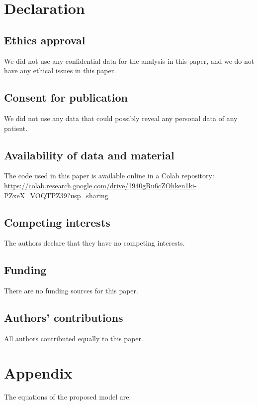 \documentclass[11pt]{article}
\begin{document}
\section{Declaration}

\subsection{Ethics approval} We did not use any confidential data for the analysis in this paper, and we do not have any ethical issues in this paper.

\subsection{Consent for publication}

We did not use any data that could possibly reveal any personal data of any patient.

\subsection{Availability of data and material} The code used in this paper is available online in a Colab repository: \url{https://colab.research.google.com/drive/1940gRu6cZOhken1ki-PZxeX_VOQTPZ39?usp=sharing}

\subsection{ Competing interests } The authors declare that they have no competing interests.


\subsection{ Funding } There are no funding sources for this paper.

\subsection{Authors' contributions}  All authors contributed equally to this paper.







\section{Appendix}
\setcounter{equation}{0}
The equations of the proposed model are: 
\end{document}

